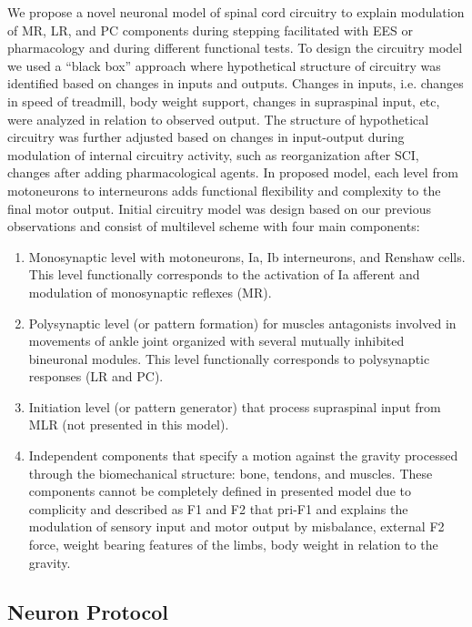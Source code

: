 \documentclass[]{elsarticle}
\begin{document}
We propose a novel neuronal model of spinal cord circuitry to explain modulation of MR, LR, and PC components during stepping facilitated with EES or pharmacology and during different functional tests. 
To design the circuitry model we used a ``black box'' approach where hypothetical structure of circuitry was identified based on changes in inputs and outputs. 
Changes in inputs, i.e. changes in speed of treadmill, body weight support, changes in supraspinal input, etc, were analyzed in relation to observed output. The structure of hypothetical circuitry was further adjusted based on changes in input-output during modulation of internal circuitry activity, such as reorganization after SCI, changes after adding pharmacological agents. In proposed model, each level from motoneurons to interneurons adds functional flexibility and complexity to the final motor output. Initial circuitry model was design based on our previous observations and consist of multilevel scheme with four main components:

\begin{enumerate}
	\item Monosynaptic level with motoneurons, Ia, Ib interneurons, and Renshaw cells. This level functionally corresponds to the activation of Ia afferent and modulation of monosynaptic reflexes (MR).
	\item Polysynaptic level (or pattern formation) for muscles antagonists involved in movements of ankle joint organized with several mutually inhibited bineuronal modules. This level functionally corresponds to polysynaptic responses (LR and PC).
	\item Initiation level (or pattern generator) that process supraspinal input from MLR (not presented in this model). 
	\item Independent components that specify a motion against the gravity processed through the biomechanical structure: bone, tendons, and muscles. These components cannot be completely defined in presented model due to complicity and described as F1 and F2 that pri-F1 and explains the modulation of sensory input and motor output by misbalance, external F2 force, weight bearing features of the limbs, body weight in relation to the gravity. 
\end{enumerate}

\subsection{Neuron Protocol}
\end{document}
